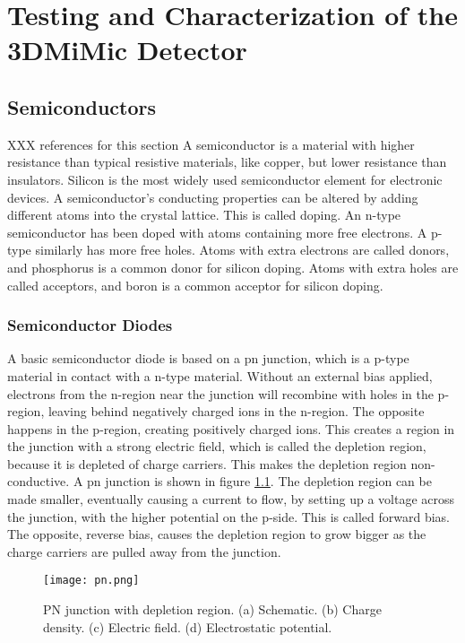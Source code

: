 \documentclass[../main/thesis.tex]{subfiles}
\begin{document}
\newchapter
\chapter{Testing and Characterization of the 3DMiMic Detector}
\label{3dmimic}

\section{Semiconductors}
\label{t-semi}
XXX references for this section
A semiconductor is a material with higher resistance than typical resistive materials, like copper, but lower resistance than insulators. Silicon is the most widely used semiconductor element for electronic devices. A semiconductor's conducting properties can be altered by adding different atoms into the crystal lattice. This is called doping. An n-type semiconductor has been doped with atoms containing more free electrons. A p-type similarly has more free holes. Atoms with extra electrons are called donors, and phosphorus is a common donor for silicon doping. Atoms with extra holes are called acceptors, and boron is a common acceptor for silicon doping. 

\subsection{Semiconductor Diodes}

A basic semiconductor diode is based on a pn junction, which is a p-type material in contact with a n-type material. Without an external bias applied, electrons from the n-region near the junction will recombine with holes in the p-region, leaving behind negatively charged ions in the n-region. The opposite happens in the p-region, creating positively charged ions. This creates a region in the junction with a strong electric field, which is called the depletion region, because it is depleted of charge carriers. This makes the depletion region non-conductive. A pn junction is shown in figure \ref{fig-pn}. The depletion region can be made smaller, eventually causing a current to flow, by setting up a voltage across the junction, with the higher potential on the p-side. This is called forward bias. The opposite, reverse bias, causes the depletion region to grow bigger as the charge carriers are pulled away from the junction. 

\begin{figure}%
	\centering
	\texttt{[image: pn.png]}
	\caption{PN junction with depletion region. (a) Schematic. (b) Charge density. (c) Electric field. (d) Electrostatic potential. \citep{analogbok}}
	\label{fig-pn}
\end{figure}
\end{document}
